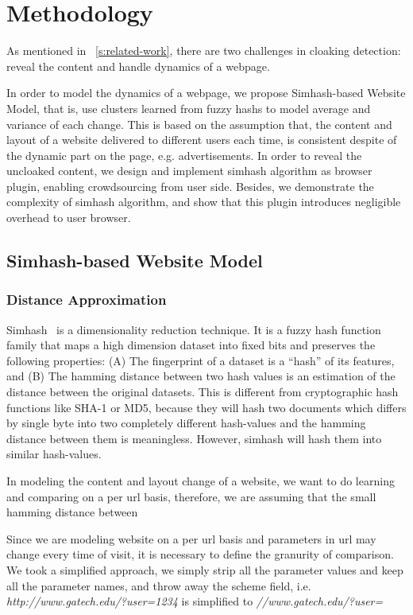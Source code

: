 \section{Methodology}
\label{s:methodology}
As mentioned in ~\autoref{s:related-work}, there are two challenges in cloaking
detection: reveal the content and handle dynamics of a webpage.

In order to model the dynamics of a webpage, we propose Simhash-based Website
Model, that is, use clusters learned from fuzzy hashs to model average and
variance of each change. This is based on the assumption that, the content and
layout of a website delivered to different users each time, is consistent
despite of the dynamic part on the page, e.g. advertisements. In order to reveal
the uncloaked content, we design and implement simhash algorithm as browser
plugin, enabling crowdsourcing from user side.
Besides, we demonstrate the complexity of simhash algorithm, and show
that this plugin introduces negligible overhead to user browser.

\subsection{Simhash-based Website Model}
\subsubsection{Distance Approximation}
Simhash~\cite{charikar2002similarity} is a dimensionality reduction technique.
It is a fuzzy hash function family that maps a high dimension dataset into fixed
bits and preserves the following properties: 
(A) The fingerprint of a dataset is a “hash” of its features, and (B) The
hamming distance between two hash values is an estimation of the distance
between the original datasets.
This is different from 
cryptographic hash functions like SHA-1 or MD5, because they will hash two
documents which differs by single byte into two completely different hash-values and the
hamming distance between them is meaningless. 
However, simhash will hash them into similar hash-values.

In modeling the content and layout change of a website, we want to do learning
and comparing on a per url basis, therefore, we are assuming that the small hamming
distance between 

Since we are modeling website on a per url basis and parameters in url may
change every time of visit, it is necessary to define the granurity of
comparison. We took a simplified approach, we simply strip all the parameter
values and keep all the parameter names, and throw away the scheme field, i.e.
{\it http://www.gatech.edu/?user=1234} is simplified to
{\it //www.gatech.edu/?user=}


